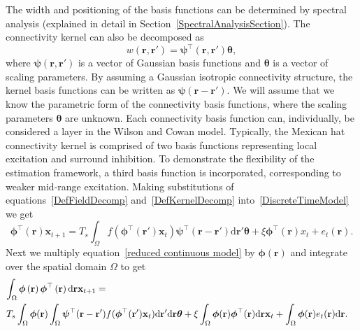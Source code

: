 \documentclass[10pt]{article}
\begin{document}
The width and positioning of the basis functions can be determined by spectral analysis (explained in detail in Section~\ref{SpectralAnalysisSection}). The connectivity kernel can also be decomposed as 
\begin{equation}\label{DefKernelDecomp}
	 w\left(\mathbf{r},\mathbf{r}'\right) =\boldsymbol{\psi}^\top\left(\mathbf{r},\mathbf{r}'\right) \boldsymbol{\theta},
\end{equation}
where $\boldsymbol{\psi}(\mathbf{r},\mathbf{r}')$ is a vector of Gaussian basis functions and $\boldsymbol{\theta}$ is a vector of scaling parameters. By assuming a Gaussian isotropic connectivity structure, the kernel basis functions can be written as $\boldsymbol{\psi}(\mathbf{r}-\mathbf{r}')$. We will assume that we know the parametric form of the connectivity basis functions, where the scaling parameters $\boldsymbol{\theta}$ are unknown. Each connectivity basis function can, individually, be considered a layer in the Wilson and Cowan model. Typically, the Mexican hat connectivity kernel is comprised of two basis functions representing local excitation and surround inhibition. To demonstrate the flexibility of the estimation framework, a third basis function is incorporated, corresponding to weaker mid-range excitation. Making substitutions of equations~\ref{DefFieldDecomp} and~\ref{DefKernelDecomp} into~\ref{DiscreteTimeModel} we get 
\begin{equation}
	\label{reduced continuous model}\boldsymbol{\phi}^{\top}(\mathbf{r})\mathbf{x}_{t+1}= T_s\int_\Omega{f(\boldsymbol{\phi}^{\top}(\mathbf{r}')\mathbf{x}_t )\boldsymbol{\psi}^{\top}(\mathbf{r}-\mathbf{r}')\textrm{d}\mathbf{r}'}\boldsymbol{\theta}
	+ \xi\boldsymbol{\phi}^{\top}(\mathbf{r})x_t + e_t(\mathbf{r}). 
\end{equation}
Next we multiply equation~\ref{reduced continuous model} by $\boldsymbol{\phi}(\mathbf{r})$ and integrate over the spatial domain $\Omega$ to get 
\begin{equation}
    \begin{split}
	\label{StartofReduction}
	\lefteqn{ \int_\Omega {\boldsymbol{\phi} \left(\mathbf{r}\right)\boldsymbol{\phi}^{\top}\left(\mathbf{r}\right) \textrm{d}\mathbf{r}} \mathbf{x}_{t+1}=} \\
 &T_s \int_\Omega {\boldsymbol{\phi} (\mathbf{r}) \int_\Omega {\boldsymbol{\psi}^{\top} (\mathbf{r}-\mathbf{r}') f(\boldsymbol{\phi}^{\top}(\mathbf{r}') \mathbf{x}_t ) \textrm{d}\mathbf{r}'}\textrm{d}\mathbf{r}}\boldsymbol{\theta}  + \xi\int_\Omega {\boldsymbol{\phi}(\mathbf{r})\boldsymbol{\phi}^{\top}(\mathbf{r})\textrm{d}\mathbf{r}} \mathbf{x}_t+
\int_\Omega{\boldsymbol{\phi} (\mathbf{r}) e_t(\mathbf{r})\textrm{d}\mathbf{r}}. 
\end{split}
\end{equation}
\end{document}
